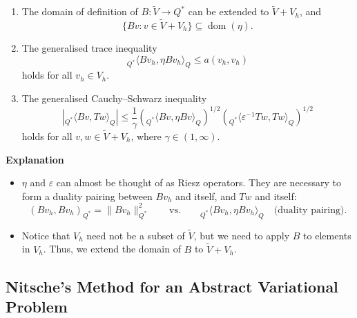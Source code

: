 \documentclass[11pt,a4paper]{article}
\begin{document}
\begin{enumerate}[label=(\alph*)]
    \item The domain of definition of $B:\widetilde V\to Q^*$ can be extended to $\widetilde V+V_h$, and
    \[
        \{Bv:v\in\widetilde V+V_h\}\subseteq\operatorname{dom}(\eta).
    \]

    \item The generalised trace inequality
    \[
        {}_{Q^*}\langle Bv_h,\eta Bv_h\rangle_Q
        \le a(v_h,v_h)
    \]
    holds for all $v_h\in V_h$.

    \item The generalised Cauchy--Schwarz inequality
    \[
        \left|{}_{Q^*}\langle Bv,Tw\rangle_Q\right|
        \le \frac1\gamma
        \left({}_{Q^*}\langle Bv,\eta Bv\rangle_Q\right)^{1/2}
        \left({}_{Q^*}\langle\varepsilon^{-1}Tw,Tw\rangle_Q\right)^{1/2}
    \]
    holds for all $v,w\in\widetilde V+V_h$, where $\gamma\in(1,\infty)$.
\end{enumerate}

\textbf{Explanation}

\begin{itemize}
    \item $\eta$ and $\varepsilon$ can almost be thought of as Riesz operators. They are necessary to form a duality pairing between $Bv_h$ and itself, and $Tw$ and itself:
    \[
        (Bv_h,Bv_h)_{Q^*}=\|Bv_h\|_{Q^*}^2
        \qquad\text{vs.}\qquad
        {}_{Q^*}\langle Bv_h,\eta Bv_h\rangle_Q
        \quad\text{(duality pairing)}.
    \]

    \item Notice that $V_h$ need not be a subset of $\widetilde V$, but we need to apply $B$ to elements in $V_h$. Thus, we extend the domain of $B$ to $\widetilde V+V_h$.

\end{itemize}

\subsection{Nitsche's Method for an Abstract Variational Problem}
\end{document}
